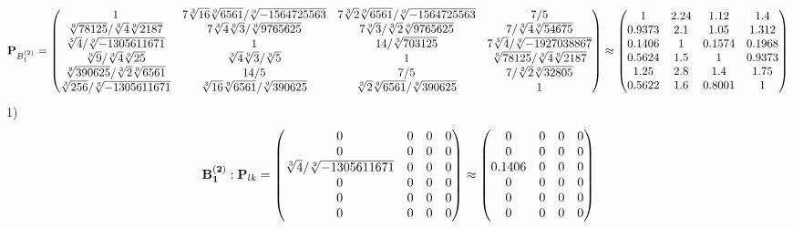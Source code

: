 \documentclass[10pt,a4paper]{article}
\begin{document}
	\[
		\bold{P}_{B_1^{(2)}} = 
		\begin{pmatrix}
			{1}{} & {{7}\sqrt[3]{16}\sqrt[9]{6561}} / {\sqrt[9]{-1564725563}} & {{7}\sqrt[3]{2}\sqrt[9]{6561}} / {\sqrt[9]{-1564725563}} & {{7}} / {{5}} \\
			{\sqrt[9]{78125}} / {\sqrt[3]{4}\sqrt[9]{2187}} & {{7}\sqrt[3]{4}\sqrt[9]{3}} / {\sqrt[9]{9765625}} & {{7}\sqrt[9]{3}} / {\sqrt[3]{2}\sqrt[9]{9765625}} & {{7}} / {\sqrt[3]{4}\sqrt[9]{54675}} \\
			{\sqrt[3]{4}} / {\sqrt[9]{-1305611671}} & {1}{} & {{14}} / {\sqrt[3]{703125}} & {{7}\sqrt[3]{4}} / {\sqrt[9]{-1927038867}} \\
			{\sqrt[9]{9}} / {\sqrt[3]{4}\sqrt[9]{25}} & {\sqrt[3]{4}\sqrt[9]{3}} / {\sqrt[9]{5}} & {1}{} & {\sqrt[9]{78125}} / {\sqrt[3]{4}\sqrt[9]{2187}} \\
			{\sqrt[9]{390625}} / {\sqrt[3]{2}\sqrt[9]{6561}} & {{14}} / {{5}} & {{7}} / {{5}} & {{7}} / {\sqrt[3]{2}\sqrt[9]{32805}} \\
			{\sqrt[3]{256}} / {\sqrt[9]{-1305611671}} & {\sqrt[3]{16}\sqrt[9]{6561}} / {\sqrt[9]{390625}} & {\sqrt[3]{2}\sqrt[9]{6561}} / {\sqrt[9]{390625}} & {1}{} \\
		\end{pmatrix}
		\approx
		\begin{pmatrix}
			1        & 2.24     & 1.12     & 1.4      \\
			0.9373   & 2.1      & 1.05     & 1.312    \\
			0.1406   & 1        & 0.1574   & 0.1968   \\
			0.5624   & 1.5      & 1        & 0.9373   \\
			1.25     & 2.8      & 1.4      & 1.75     \\
			0.5622   & 1.6      & 0.8001   & 1        \\
		\end{pmatrix}
	\]
	1)
	\[
		\bold{B_1^{(2)}}: \bold{P}_{lk} = 
		\begin{pmatrix}
			{{0}}{} & {{0}}{} & {{0}}{} & {{0}}{} \\
			{{0}}{} & {{0}}{} & {{0}}{} & {{0}}{} \\
			{\sqrt[3]{4}} / {\sqrt[9]{-1305611671}} & {{0}}{} & {{0}}{} & {{0}}{} \\
			{{0}}{} & {{0}}{} & {{0}}{} & {{0}}{} \\
			{{0}}{} & {{0}}{} & {{0}}{} & {{0}}{} \\
			{{0}}{} & {{0}}{} & {{0}}{} & {{0}}{} \\
		\end{pmatrix}
		\approx
		\begin{pmatrix}
			0        & 0        & 0        & 0        \\
			0        & 0        & 0        & 0        \\
			0.1406   & 0        & 0        & 0        \\
			0        & 0        & 0        & 0        \\
			0        & 0        & 0        & 0        \\
			0        & 0        & 0        & 0        \\
		\end{pmatrix}
	\]
\end{document}
